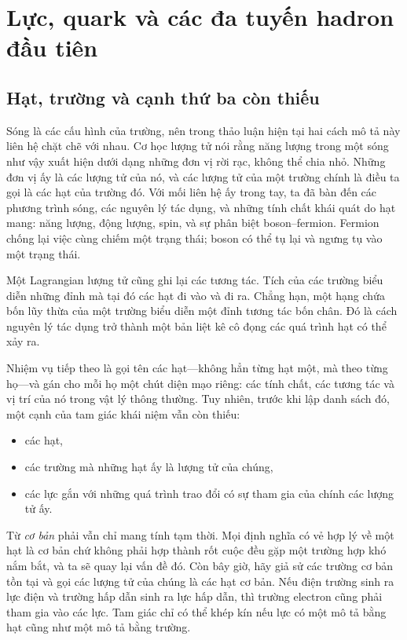 \chapter{Lực, quark và các đa tuyến hadron đầu tiên}

\section{Hạt, trường và cạnh thứ ba còn thiếu}

Sóng là các cấu hình của trường, nên trong thảo luận hiện tại hai cách mô tả này liên hệ chặt chẽ với nhau. Cơ học lượng tử nói rằng năng lượng trong một sóng như vậy xuất hiện dưới dạng những đơn vị rời rạc, không thể chia nhỏ. Những đơn vị ấy là các lượng tử của nó, và các lượng tử của một trường chính là điều ta gọi là các hạt của trường đó. Với mối liên hệ ấy trong tay, ta đã bàn đến các phương trình sóng, các nguyên lý tác dụng, và những tính chất khái quát do hạt mang: năng lượng, động lượng, spin, và sự phân biệt boson--fermion. Fermion chống lại việc cùng chiếm một trạng thái; boson có thể tụ lại và ngưng tụ vào một trạng thái.

Một Lagrangian lượng tử cũng ghi lại các tương tác. Tích của các trường biểu diễn những đỉnh mà tại đó các hạt đi vào và đi ra. Chẳng hạn, một hạng chứa bốn lũy thừa của một trường biểu diễn một đỉnh tương tác bốn chân. Đó là cách nguyên lý tác dụng trở thành một bản liệt kê cô đọng các quá trình hạt có thể xảy ra.

Nhiệm vụ tiếp theo là gọi tên các hạt---không hẳn từng hạt một, mà theo từng họ---và gán cho mỗi họ một chút diện mạo riêng: các tính chất, các tương tác và vị trí của nó trong vật lý thông thường. Tuy nhiên, trước khi lập danh sách đó, một cạnh của tam giác khái niệm vẫn còn thiếu:
\begin{itemize}
\item các hạt,
\item các trường mà những hạt ấy là lượng tử của chúng,
\item các lực gắn với những quá trình trao đổi có sự tham gia của chính các lượng tử ấy.
\end{itemize}

Từ \emph{cơ bản} phải vẫn chỉ mang tính tạm thời. Mọi định nghĩa có vẻ hợp lý về một hạt là cơ bản chứ không phải hợp thành rốt cuộc đều gặp một trường hợp khó nắm bắt, và ta sẽ quay lại vấn đề đó. Còn bây giờ, hãy giả sử các trường cơ bản tồn tại và gọi các lượng tử của chúng là các hạt cơ bản. Nếu điện trường sinh ra lực điện và trường hấp dẫn sinh ra lực hấp dẫn, thì trường electron cũng phải tham gia vào các lực. Tam giác chỉ có thể khép kín nếu lực có một mô tả bằng hạt cũng như một mô tả bằng trường.

